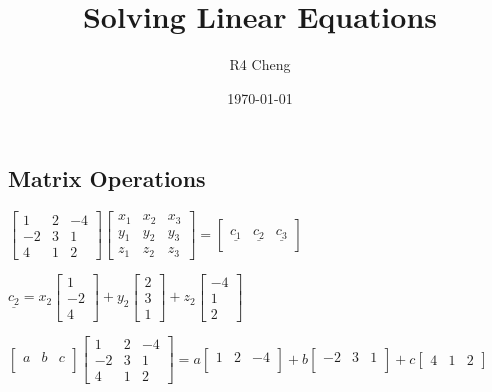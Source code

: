 \documentclass[12pt,a4paper]{article}
\title{Solving Linear Equations}
\author{R4 Cheng}
\date{\today}
\begin{document}
\maketitle

\subsection*{Matrix Operations}

$
\begin{bmatrix}
  1 & 2 & -4 \\
  -2 & 3 & 1 \\
  4 & 1 & 2
\end{bmatrix}
\begin{bmatrix}
  x_1 & x_2 & x_3 \\
  y_1 & y_2 & y_3 \\
  z_1 & z_2 & z_3 
\end{bmatrix} = 
\begin{bmatrix}
  & \\
  \underline{c_1} & \underline{c_2} & \underline{c_3} \\
  &
\end{bmatrix}
$

$
\underline{c_2} = 
x_2
\begin{bmatrix}
  1 \\
  -2 \\
  4
\end{bmatrix} + 
y_2
\begin{bmatrix}
  2 \\
  3 \\
  1
\end{bmatrix} +
z_2
\begin{bmatrix}
  -4 \\
  1 \\
  2
\end{bmatrix}
$

$
\begin{bmatrix}
  a & b & c \\
\end{bmatrix}
\begin{bmatrix}
  1 & 2 & -4 \\
  -2 & 3 & 1 \\
  4 & 1 & 2
\end{bmatrix} = 
a
\begin{bmatrix}
  1 & 2 & -4 \\
\end{bmatrix} +
b
\begin{bmatrix}
  -2 & 3 & 1 \\
\end{bmatrix} +
c
\begin{bmatrix}
  4 & 1 & 2
\end{bmatrix}
$
\end{document}
